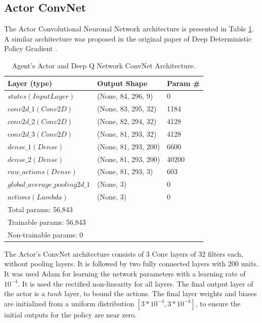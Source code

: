 \documentclass[peerreview,onecolumn]{IEEEtran}
\begin{document}
	 \subsection{Actor ConvNet}
	 
	 The Actor Convolutional Neuronal Network architecture is presented in Table \ref{tab:actor_arch}. A similar architecture was proposed in the original paper of Deep Deterministic Policy Gradient \cite{ddpg_2015}. 
	 
	 \begin{table}[h] 
	\centering
	\begin{tabular}{l l l} 
		\toprule 
		Layer (type) & Output Shape & Param \# \\ 		
		\midrule
		$states (InputLayer)$ & (None, 84, 296, 9) & 0\\ 
		$conv2d\_1 (Conv2D)$ & (None, 83, 295, 32) & 1184  \\ 
		$conv2d\_2 (Conv2D)$ & (None, 82, 294, 32) & 4128  \\
		$conv2d\_3 (Conv2D)$ & (None, 81, 293, 32) & 4128  \\
		$dense\_1 (Dense)$  & (None, 81, 293, 200) & 6600  \\   
		$dense\_2 (Dense)$ & (None, 81, 293, 200)  & 40200 \\
		$raw\_actions (Dense)$ & (None, 81, 293, 3) & 603  \\
		$global\_average\_pooling2d\_1$ & (None, 3) & 0  \\
		$actions (Lambda)$ & (None, 3) &  0 \\
		\midrule 
		\midrule
		Total params: 56,843 & &  \\
		Trainable params: 56,843 & &  \\
		Non-trainable params: 0 & & \\

		\bottomrule 
	\end{tabular}
	\smallskip 
	\caption{Agent's Actor and Deep Q Network ConvNet Architecture.} 
	\label{tab:actor_arch} 
\end{table}

The Actor's ConvNet architecture consists of 3 Conv layers of 32 filters each, without pooling layers. It is followed by two fully connected layers with 200 units. It was used Adam \cite{adam_2014} for learning the network parameters with a learning rate of $10^{-4}$. It is used the rectified non-linearity \cite{relu_2011} for all layers. The final output layer of the actor is a $tanh$ layer, to bound the actions. The final layer weights and biases are initialized from a uniform distribution $[3 * 10^{-4}, 3 * 10^{-4}]$, to ensure the initial outputs for the policy are near zero.
	 
\end{document}
